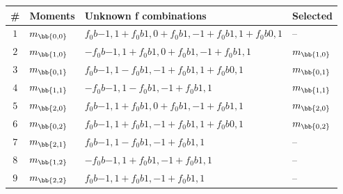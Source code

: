 \begin{table}[!h]
\centering
\begin{tabular}{c l l l}
\toprule
\# & Moments & Unknown f combinations & Selected\\
\midrule
\multirow{ 1}{*}{$1$} & \multirow{ 1}{*}{$m_\bb{0,0}$} & $f_0b{-1,1}+f_0b{1,0}+f_0b{1,-1}+f_0b{1,1}+f_0b{0,1}$ & \multirow{ 1}{*}{--}\\ 
\midrule
\multirow{ 1}{*}{$2$} & \multirow{ 1}{*}{$m_\bb{1,0}$} & $-f_0b{-1,1}+f_0b{1,0}+f_0b{1,-1}+f_0b{1,1}$ & \multirow{ 1}{*}{$m_\bb{1,0}$}\\ 
\midrule
\multirow{ 1}{*}{$3$} & \multirow{ 1}{*}{$m_\bb{0,1}$} & $f_0b{-1,1}-f_0b{1,-1}+f_0b{1,1}+f_0b{0,1}$ & \multirow{ 1}{*}{$m_\bb{0,1}$}\\ 
\midrule
\multirow{ 1}{*}{$4$} & \multirow{ 1}{*}{$m_\bb{1,1}$} & $-f_0b{-1,1}-f_0b{1,-1}+f_0b{1,1}$ & \multirow{ 1}{*}{$m_\bb{1,1}$}\\ 
\midrule
\multirow{ 1}{*}{$5$} & \multirow{ 1}{*}{$m_\bb{2,0}$} & $f_0b{-1,1}+f_0b{1,0}+f_0b{1,-1}+f_0b{1,1}$ & \multirow{ 1}{*}{$m_\bb{2,0}$}\\ 
\midrule
\multirow{ 1}{*}{$6$} & \multirow{ 1}{*}{$m_\bb{0,2}$} & $f_0b{-1,1}+f_0b{1,-1}+f_0b{1,1}+f_0b{0,1}$ & \multirow{ 1}{*}{$m_\bb{0,2}$}\\ 
\midrule
\multirow{ 1}{*}{$7$} & \multirow{ 1}{*}{$m_\bb{2,1}$} & $f_0b{-1,1}-f_0b{1,-1}+f_0b{1,1}$ & \multirow{ 1}{*}{--}\\ 
\midrule
\multirow{ 1}{*}{$8$} & \multirow{ 1}{*}{$m_\bb{1,2}$} & $-f_0b{-1,1}+f_0b{1,-1}+f_0b{1,1}$ & \multirow{ 1}{*}{--}\\ 
\midrule
\multirow{ 1}{*}{$9$} & \multirow{ 1}{*}{$m_\bb{2,2}$} & $f_0b{-1,1}+f_0b{1,-1}+f_0b{1,1}$ & \multirow{ 1}{*}{--}\\ 
\bottomrule
\end{tabular}\end{table}
